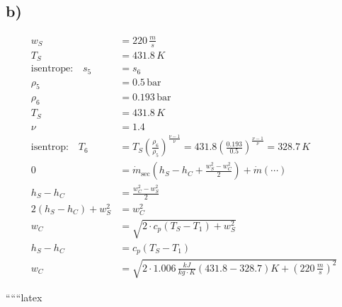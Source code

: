 

\subsection*{b)}

\begin{align*}
    w_S &= 220 \, \frac{m}{s} \\
    T_S &= 431.8 \, K \\
    \text{isentrope:} \quad s_5 &= s_6 \\
    \rho_5 &= 0.5 \, \text{bar} \\
    \rho_6 &= 0.193 \, \text{bar} \\
    T_S &= 431.8 \, K \\
    \nu &= 1.4 \\
    \text{isentrop:} \quad T_6 &= T_S \left( \frac{\rho_6}{\rho_5} \right)^{\frac{\nu - 1}{\nu}} = 431.8 \left( \frac{0.193}{0.5} \right)^{\frac{\nu - 1}{\nu}} = 328.7 \, K \\
    0 &= \dot{m}_{\text{sec}} \left( h_S - h_C + \frac{w_S^2 - w_C^2}{2} \right) + \dot{m} \left( \cdots \right) \\
    h_S - h_C &= \frac{w_C^2 - w_S^2}{2} \\
    2 (h_S - h_C) + w_S^2 &= w_C^2 \\
    w_C &= \sqrt{2 \cdot c_p \left( T_S - T_1 \right) + w_S^2} \\
    h_S - h_C &= c_p \left( T_S - T_1 \right) \\
    w_C &= \sqrt{2 \cdot 1.006 \, \frac{kJ}{kg \cdot K} \left( 431.8 - 328.7 \right) K + (220 \, \frac{m}{s})^2}
\end{align*}

``````latex